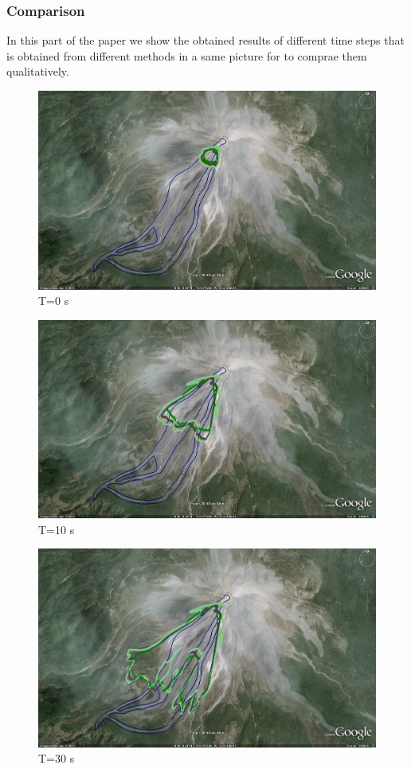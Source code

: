 \documentclass[letterpaper,10pt]{article}
\begin{document}
\subsubsection{Comparison}

In this part of the paper we show the obtained results of different time steps that is obtained from different methods in a same picture for to comprae them 
qualitatively.

\begin{figure}[H]
\centerline{\includegraphics[width=.9\textwidth]{IMAGES/pics/comp1.jpg}}
\caption{T=0 s}
\label{comp1}
\end{figure}
\begin{figure}[H]
\centerline{\includegraphics[width=.9\textwidth]{IMAGES/pics/comp3.jpg}}
\caption{T=10 s}
\label{comp3}
\end{figure}
\begin{figure}[H]
\centerline{\includegraphics[width=.9\textwidth]{IMAGES/pics/comp6.jpg}}
\caption{T=30 s}
\label{comp6}
\end{figure}
\end{document}
